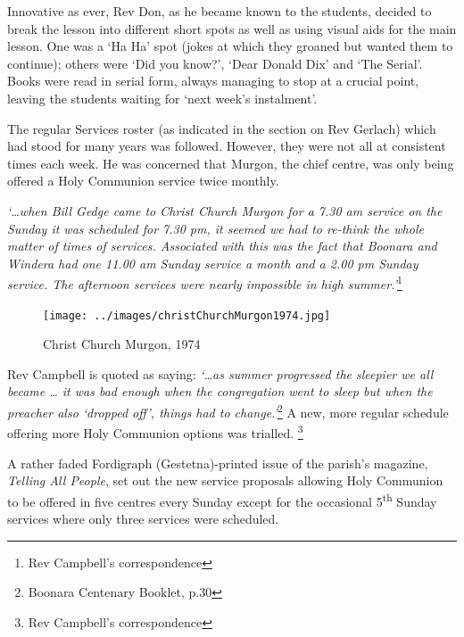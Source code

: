 Innovative as ever, Rev Don, as he became known to the students, decided to break the lesson into different short spots as well as using visual aids for the main lesson. One was a `Ha Ha' spot (jokes at which they groaned but wanted them to continue); others were `Did you know?', `Dear Donald Dix' and `The Serial'. Books were read in serial form, always managing to stop at a crucial point, leaving the students waiting for `next week's instalment'.



The regular Services roster (as indicated in the section on Rev Gerlach) which had stood for many years was followed. However, they were not all at consistent times each week. He was concerned that Murgon, the chief centre, was only being offered a Holy Communion service twice monthly.



\emph{`\ldots when Bill Gedge came to Christ Church Murgon for a 7.30 am service on the Sunday it was scheduled for 7.30 pm, it seemed we had to re-think the whole matter of times of services. Associated with this was the fact that Boonara and Windera had one 11.00 am Sunday service a month and a 2.00 pm Sunday service. The afternoon services were nearly impossible in high summer.'}\footnote{Rev Campbell's correspondence}








\begin{figure}
\begin{center}
\texttt{[image: ../images/christChurchMurgon1974.jpg]}
\caption{Christ Church Murgon, 1974}
\end{center}
\end{figure}




Rev Campbell is quoted as saying: \emph{`\ldots as summer progressed the sleepier we all became \ldots{} it was bad enough when the congregation went to sleep but when the preacher also `dropped off', things had to change.'}\footnote{Boonara Centenary Booklet, p.30} A new, more regular schedule offering more Holy Communion options was trialled. \footnote{Rev Campbell's correspondence}


A rather faded Fordigraph (Gestetna)-printed issue of the parish's magazine, \emph{Telling All People}, set out the new service proposals allowing Holy Communion to be offered in five centres every Sunday except for the occasional 5\textsuperscript{th} Sunday services where only three services were scheduled.



